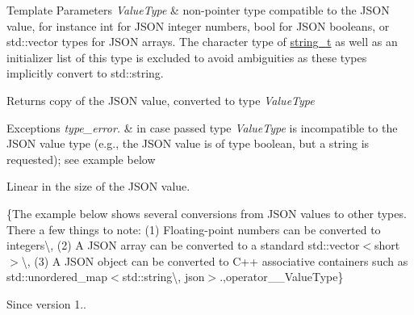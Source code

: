 \begin{DoxyTemplParams}{Template Parameters}
{\em Value\+Type} & non-\/pointer type compatible to the J\+S\+ON value, for instance {\ttfamily int} for J\+S\+ON integer numbers, {\ttfamily bool} for J\+S\+ON booleans, or {\ttfamily std\+::vector} types for J\+S\+ON arrays. The character type of \mbox{\hyperlink{classnlohmann_1_1basic__json_a61f8566a1a85a424c7266fb531dca005}{string\+\_\+t}} as well as an initializer list of this type is excluded to avoid ambiguities as these types implicitly convert to {\ttfamily std\+::string}.\\
\hline
\end{DoxyTemplParams}
\begin{DoxyReturn}{Returns}
copy of the J\+S\+ON value, converted to type {\itshape Value\+Type} 
\end{DoxyReturn}

\begin{DoxyExceptions}{Exceptions}
{\em type\+\_\+error.} & in case passed type {\itshape Value\+Type} is incompatible to the J\+S\+ON value type (e.\+g., the J\+S\+ON value is of type boolean, but a string is requested); see example below\\
\hline
\end{DoxyExceptions}
Linear in the size of the J\+S\+ON value.

\{The example below shows several conversions from J\+S\+ON values to other types. There a few things to note\+: (1) Floating-\/point numbers can be converted to integers\textbackslash{}, (2) A J\+S\+ON array can be converted to a standard {\ttfamily std\+::vector$<$short$>$}\textbackslash{}, (3) A J\+S\+ON object can be converted to C++ associative containers such as {\ttfamily std\+::unordered\+\_\+map$<$std\+::string\textbackslash{}, json$>$}.,operator\+\_\+\+\_\+\+Value\+Type\}

\begin{DoxySince}{Since}
version 1.. 
\end{DoxySince}
\mbox{\label{classnlohmann_1_1basic__json_aea1085f2d35cc0e1ce119cf0110119e6}} 
